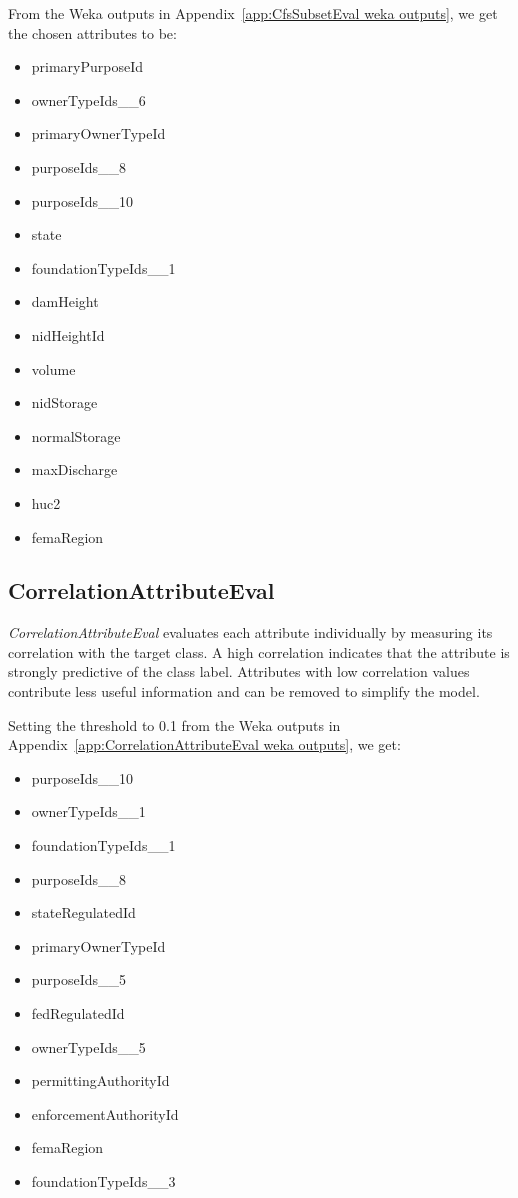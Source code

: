 \documentclass{article}
\begin{document}
From the Weka outputs in Appendix~\ref{app:CfsSubsetEval weka outputs}, we get the chosen attributes to be:
\begin{multicols}{2}
    \begin{itemize}
        \item primaryPurposeId
        \item ownerTypeIds\_\_6
        \item primaryOwnerTypeId
        \item purposeIds\_\_8
        \item purposeIds\_\_10
        \item state
        \item foundationTypeIds\_\_1
        \item damHeight
        \item nidHeightId
        \item volume
        \item nidStorage
        \item normalStorage
        \item maxDischarge
        \item huc2
        \item femaRegion
    \end{itemize}
\end{multicols}

\subsection{CorrelationAttributeEval}
\textit{CorrelationAttributeEval} evaluates each attribute individually by measuring its correlation with the target class. 
A high correlation indicates that the attribute is strongly predictive of the class label. 
Attributes with low correlation values contribute less useful information and can be removed to simplify the model.

Setting the threshold to 0.1 from the Weka outputs in Appendix~\ref{app:CorrelationAttributeEval weka outputs}, we get:
\begin{multicols}{2}
    \begin{itemize}
        \item purposeIds\_\_10
        \item ownerTypeIds\_\_1
        \item foundationTypeIds\_\_1
        \item purposeIds\_\_8
        \item stateRegulatedId
        \item primaryOwnerTypeId
        \item purposeIds\_\_5
        \item fedRegulatedId
        \item ownerTypeIds\_\_5
        \item permittingAuthorityId
        \item enforcementAuthorityId
        \item femaRegion
        \item foundationTypeIds\_\_3
    \end{itemize}
\end{multicols}
\end{document}
